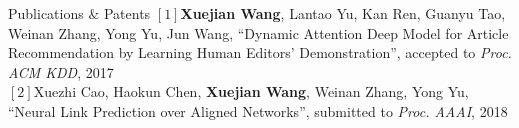 \documentclass{resume} %
\begin{document}
\begin{rSection}{Publications $\&$ Patents}
$[1]$\textbf{Xuejian Wang}, Lantao Yu, Kan Ren, Guanyu Tao, Weinan Zhang, Yong Yu, Jun Wang, ``Dynamic Attention Deep Model for Article Recommendation by Learning Human Editors’ Demonstration'', accepted to  \emph{Proc. ACM KDD}, 2017\\
$[2]$Xuezhi Cao, Haokun Chen, \textbf{Xuejian Wang}, Weinan Zhang, Yong Yu, ``Neural Link Prediction over Aligned Networks'', submitted to  \emph{Proc. AAAI}, 2018
\end{rSection}
\end{document}
